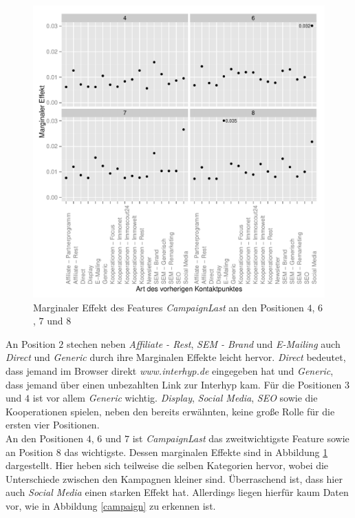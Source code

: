 \begin{figure}[H]
	\centering\includegraphics[scale=0.75]{marg_eff_campaignLast.pdf}\caption[Marginaler Effekt von \textit{CampaignLast}]{Marginaler Effekt des Features \textit{CampaignLast} an den Positionen $4$, $6$, $7$ und $8$}\label{marg_eff_campaignLast}
\end{figure}
\noindent An Position $2$ stechen neben \textit{Affiliate - Rest}, \textit{SEM - Brand} und \textit{E-Mailing} auch \textit{Direct} und \textit{Generic} durch ihre Marginalen Effekte leicht hervor. \textit{Direct} bedeutet, dass jemand im Browser direkt \textit{www.interhyp.de} eingegeben hat und \textit{Generic}, dass jemand über einen unbezahlten Link zur Interhyp kam.
Für die Positionen $3$ und $4$ ist vor allem \textit{Generic} wichtig. \textit{Display}, \textit{Social Media}, \textit{SEO} sowie die Kooperationen spielen, neben den bereits erwähnten, keine große Rolle für die ersten vier Positionen.\\
An den Positionen $4$, $6$ und $7$ ist \textit{CampaignLast} das zweitwichtigste Feature sowie an Position $8$ das wichtigste. Dessen marginalen Effekte sind in Abbildung \ref{marg_eff_campaignLast} dargestellt. Hier heben sich teilweise die selben Kategorien hervor, wobei die Unterschiede zwischen den Kampagnen kleiner sind. Überraschend ist, dass hier auch \textit{Social Media} einen starken Effekt hat. Allerdings liegen hierfür kaum Daten vor, wie in Abbildung \ref{campaign} zu erkennen ist.
